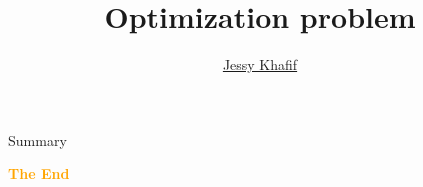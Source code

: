 \documentclass[aspectratio=43]{beamer}
\title{
    Optimization problem
} %
\author{
    \href{https://github.com/akhaten}{Jessy Khafif}
}
\begin{document}
    
    \frame{\titlepage}
    
    \begin{frame}{Summary}
        \tableofcontents
    \end{frame}
    

    
    
    
    
    

    \begin{frame}{}
        \centering
            \Huge\bfseries
        \textcolor{orange}{The End}
    \end{frame}
\end{document}

